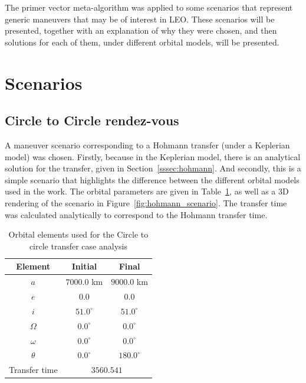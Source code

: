 
The primer vector meta-algorithm was applied to some scenarios that represent generic maneuvers that may be of interest in LEO\@. These scenarios will be presented, together with an explanation of why they were chosen, and then solutions for each of them, under different orbital models, will be presented.
\section{Scenarios}

\subsection{Circle to Circle rendez-vous}

A maneuver scenario corresponding to a Hohmann transfer (under a Keplerian model) was chosen. Firstly, because in the Keplerian model, there is an analytical solution for the transfer, given in Section~\ref{sssec:hohmann}. And secondly, this is a simple scenario that highlights the difference between the different orbital models used in the work. The orbital parameters are given in Table~\ref{tab:c2c_orb_elems}, as well as a 3D rendering of the scenario in Figure~\ref{fig:hohmann_scenario}. The transfer time was calculated analytically to correspond to the Hohmann transfer time.

\begin{table}[htbp]
    \centering
    \begin{tabular}{ccc} \toprule
        Element & Initial & Final \\ \midrule
        \(a\)      & \(7000.0\) km         & \(9000.0\) km   \\
        \(e\)      & \(0.0\)            & \(0.0\)        \\
        \(i\)      & \(51.0^\circ\)      & \(51.0^\circ\) \\
        \(\Omega\) & \(0.0^\circ\)   & \(0.0^\circ\)  \\
        \(\omega\) & \(0.0^\circ\)  & \(0.0^\circ\)  \\
        \(\theta\) & \(0.0^\circ\)  & \(180.0^\circ\)  \\ 
        Transfer time & \multicolumn{2}{c}{\(3560.541\)} \\\bottomrule
    \end{tabular}
    \caption{Orbital elements used for the Circle to circle transfer case analysis}
    \label{tab:c2c_orb_elems}
\end{table}


